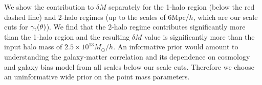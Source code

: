 \documentclass[aps, prd,twocolumn,superscriptaddress,nofootinbib,preprintnumbers]{revtex4-1}
\newcommand{\gammat}{\ensuremath{\gamma_{\rm t}(\theta)}}
\newcommand{\SP}[1]{{\color{orange}[SP: #1]}}
\newcommand{\blue}[1]{\textcolor{blue}{#1}}
\newcommand{\gary}[1]{\textcolor{red}{#1}}
\begin{document}
We show the contribution to $\delta M$ separately for the 1-halo region (below the red dashed line) and 2-halo regimes (up to the scales of 6Mpc/$h$, which are our scale cuts for $\gammat$). We find that the 2-halo regime contributes significantly more than the 1-halo region and the resulting $\delta M$ value is significantly more than the input halo mass of $2.5 \times 10^{13} M_{\odot}/h$. An informative prior would amount to understanding the galaxy-matter correlation and its dependence on cosmology and galaxy bias model from all scales below our scale cuts. Therefore we choose an uninformative wide prior on the point mass parameters.

\end{document}
